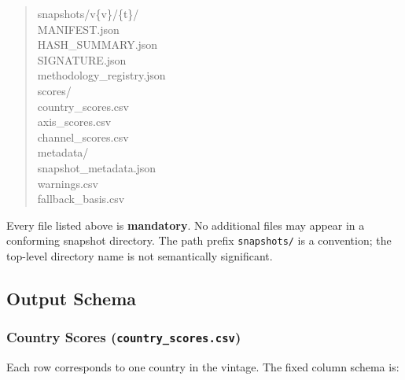 \begin{quote}\ttfamily\small
snapshots/v\{v\}/\{t\}/\\
\null\quad MANIFEST.json\\
\null\quad HASH\_SUMMARY.json\\
\null\quad SIGNATURE.json\\
\null\quad methodology\_registry.json\\
\null\quad scores/\\
\null\qquad country\_scores.csv\\
\null\qquad axis\_scores.csv\\
\null\qquad channel\_scores.csv\\
\null\quad metadata/\\
\null\qquad snapshot\_metadata.json\\
\null\qquad warnings.csv\\
\null\qquad fallback\_basis.csv
\end{quote}

Every file listed above is \textbf{mandatory}.  No additional files may
appear in a conforming snapshot directory.  The path prefix
\texttt{snapshots/} is a convention; the top-level directory name is
not semantically significant.

\subsection{Output Schema}\label{sec:snapshot:output}

\subsubsection{Country Scores (\texttt{country\_scores.csv})}

Each row corresponds to one country in the vintage.  The fixed column
schema is:


